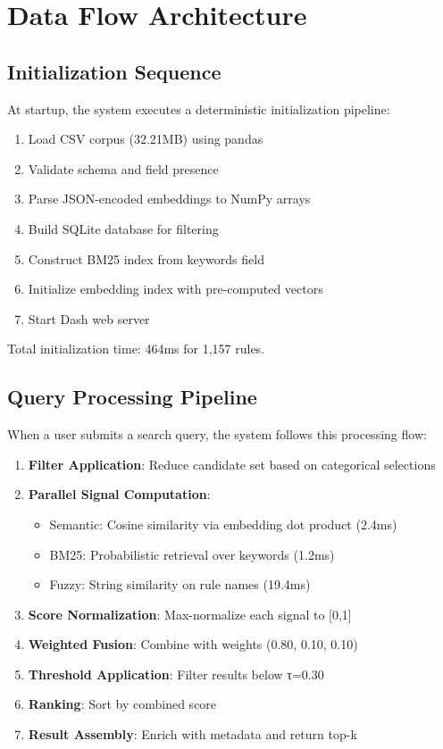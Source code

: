 \section{Data Flow Architecture}

\subsection{Initialization Sequence}

At startup, the system executes a deterministic initialization pipeline:

\begin{enumerate}[leftmargin=*,itemsep=2pt,topsep=2pt]
  \item Load CSV corpus (32.21MB) using pandas
  \item Validate schema and field presence
  \item Parse JSON-encoded embeddings to NumPy arrays
  \item Build SQLite database for filtering
  \item Construct BM25 index from keywords field
  \item Initialize embedding index with pre-computed vectors
  \item Start Dash web server
\end{enumerate}

Total initialization time: 464ms for 1,157 rules.

\subsection{Query Processing Pipeline}

When a user submits a search query, the system follows this processing flow:

\begin{enumerate}[leftmargin=*,itemsep=2pt,topsep=2pt]
  \item \textbf{Filter Application}: Reduce candidate set based on categorical selections
  \item \textbf{Parallel Signal Computation}:
     \begin{itemize}
       \item Semantic: Cosine similarity via embedding dot product (2.4ms)
       \item BM25: Probabilistic retrieval over keywords (1.2ms)
       \item Fuzzy: String similarity on rule names (19.4ms)
     \end{itemize}
  \item \textbf{Score Normalization}: Max-normalize each signal to [0,1]
  \item \textbf{Weighted Fusion}: Combine with weights (0.80, 0.10, 0.10)
  \item \textbf{Threshold Application}: Filter results below τ=0.30
  \item \textbf{Ranking}: Sort by combined score
  \item \textbf{Result Assembly}: Enrich with metadata and return top-k
\end{enumerate}

